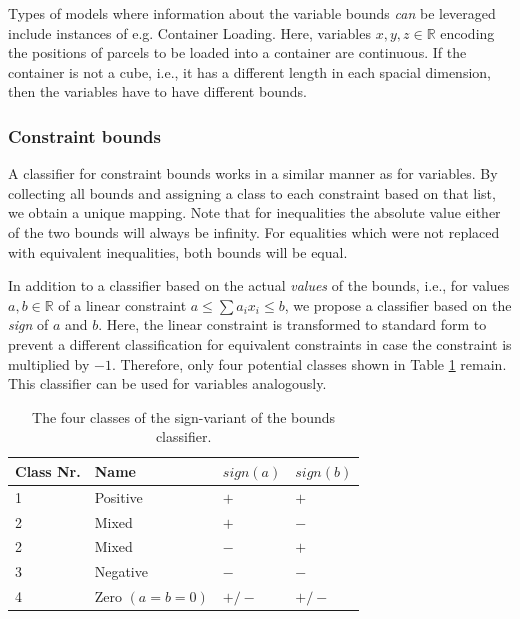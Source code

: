 				Types of models where information about the variable bounds \textit{can} be leveraged include instances of e.g. Container Loading.
				Here, variables $x, y, z \in \mathbb{R}$ encoding the positions of parcels to be loaded into a container are continuous. If the container is not a cube, i.e., it has a different length in each spacial dimension, then the variables have to have different bounds.

			\subsubsection{Constraint bounds}

				A classifier for constraint bounds works in a similar manner as for variables.
				By collecting all bounds and assigning a class to each constraint based on that list, we obtain a unique mapping.
				Note that for inequalities the absolute value either of the two bounds will always be infinity. For equalities which were not replaced with equivalent inequalities, both bounds will be equal.

				In addition to a classifier based on the actual \textit{values} of the bounds, i.e., for values $a, b \in \mathbb{R}$ of a linear constraint $a \leq \sum a_i x_i \leq b$, we propose a classifier based on the \textit{sign} of  $a$ and $b$.
				Here, the linear constraint is transformed to standard form to prevent a different classification for equivalent constraints in case the constraint is multiplied by $-1$.
				Therefore, only four potential classes shown in Table \ref{table:tree:classifiers:bounds:exist} remain.
				This classifier can be used for variables analogously.

				\begin{table}[ht!]
					\centering
					\begin{tabular}{l|l|l|l}
						\textbf{Class Nr.} & \textbf{Name} & \textbf{$sign(a)$} & \textbf{$sign(b)$} \\
						\toprule
						\toprule
						1 & Positive & $+$ & $+$ \\
						2 & Mixed &$+$ & $-$ \\
						2 & Mixed & $-$ & $+$ \\
						3 & Negative & $-$ & $-$ \\
						4 & Zero $(a = b = 0)$ & $+/-$ & $+/-$
					\end{tabular}
					 \caption{The four classes of the sign-variant of the bounds classifier.}
					 \label{table:tree:classifiers:bounds:exist}
				\end{table}

